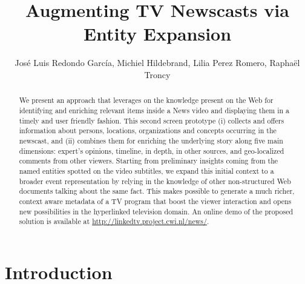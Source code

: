 \documentclass{llncs}
\begin{document}
\frontmatter          %
\pagestyle{headings}  %
\mainmatter              %

\title{Augmenting TV Newscasts via Entity Expansion}
\author{Jos\'e Luis Redondo Garc\'ia, Michiel Hildebrand, Lilia Perez Romero, Rapha\"el Troncy}


\maketitle              %


\begin{abstract}
We present an approach that leverages on the knowledge present on the Web for identifying and enriching relevant items inside a News video and displaying them in a timely and user friendly fashion. 
This second screen prototype (i) collects and offers information about persons, locations, organizations and concepts occurring in the newscast, and (ii) combines them for enriching the underlying story along five main dimensions: expert's opinions, timeline, in depth, in other sources, and geo-localized comments from other viewers. 
Starting from preliminary insights coming from the named entities spotted on the video subtitles, we expand this initial context to a broader event representation by relying in the knowledge of other non-structured Web documents talking about the same fact. This makes possible to generate a much richer, context aware metadata of a TV program that boost the viewer interaction and opens new possibilities in the hyperlinked television domain. An online demo of the proposed solution is available at \url{http://linkedtv.project.cwi.nl/news/}.

\end{abstract}


\section{Introduction}
\end{document}
